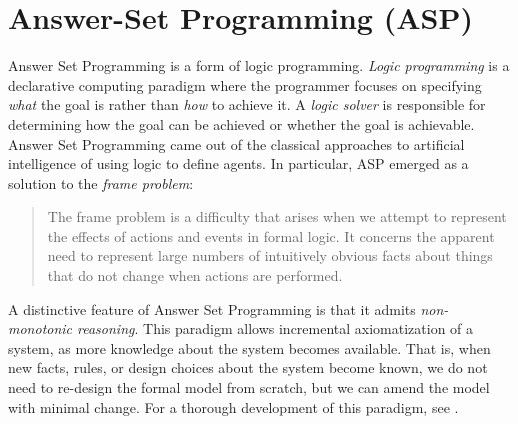 \section{Answer-Set Programming (ASP)}
Answer Set Programming is a form of logic programming.
%
\emph{Logic programming} is a declarative computing paradigm where the programmer focuses on specifying \emph{what} the goal is rather than \emph{how} to achieve it.
%
A \emph{logic solver} is responsible for determining how the goal can be achieved or whether the goal is achievable.
%
Answer Set Programming came out of the classical approaches to artificial intelligence of using logic to define agents.
%
In particular, ASP emerged as a solution to the \emph{frame problem}:
\begin{quote}
    The frame problem is a difficulty that arises when we attempt to represent the effects of actions and events in formal logic. It concerns the apparent need to represent large numbers of intuitively obvious facts about things that do not change when actions are performed. \cite{Shanahan.1997}
\end{quote}
A distinctive feature of Answer Set Programming is that it admits \emph{non-monotonic reasoning}.
%
This paradigm allows incremental axiomatization of a system, as more knowledge about the system becomes available.
%
That is, when new facts, rules, or design choices about the system become known, we do not need to re-design the formal model from scratch, but we can amend the model with minimal change.
%
For a thorough development of this paradigm, see \cite{Shanahan.1997}.


